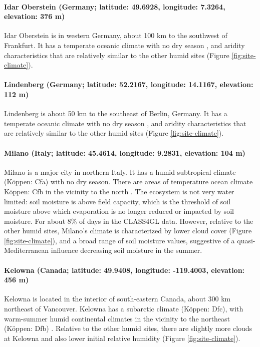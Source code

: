 \documentclass[12pt]{article}
\begin{document}
\paragraph{Idar Oberstein (Germany; latitude: 49.6928, longitude:
  7.3264, elevation: 376 m)} Idar Oberstein is in western Germany,
about 100 km to the southwest of Frankfurt. It has a temperate oceanic
climate with no dry season \cite[K\"{o}ppen: Cfb,][]{rubel2010}, and
aridity characteristics that are relatively similar to the other humid
sites (Figure \ref{fig:site-climate}).

\paragraph{Lindenberg (Germany; latitude: 52.2167, longitude:
  14.1167, elevation: 112 m)}

Lindenberg is about 50 km to the southeast of Berlin, Germany. It has
a temperate oceanic climate with no dry season \cite[(K\"{o}ppen:
  Cfb)][]{rubel2010}, and aridity characteristics that are relatively
similar to the other humid sites (Figure \ref{fig:site-climate}).

\paragraph{Milano (Italy; latitude: 45.4614, longitude: 9.2831, elevation: 104 m)}

Milano is a major city in northern Italy. It has a humid subtropical
climate (K\"{o}ppen: Cfa) with no dry season. There are areas of
temperature ocean climate K\"{o}ppen: Cfb in the vicinity to the north
\cite{rubel2010}. The ecosystem is not very water limited: soil
moisture is above field capacity, which is the threshold of soil
moisture above which evaporation is no longer reduced or impacted by
soil moisture. For about 8\% of days in the CLASS4GL data. However,
relative to the other humid sites, Milano's climate is characterized
by lower cloud cover (Figure \ref{fig:site-climate}), and a broad
range of soil moisture values, suggestive of a quasi-Mediterranean
influence decreasing soil moisture in the summer.

\paragraph{Kelowna (Canada; latitude: 49.9408, longitude: -119.4003,
  elevation: 456 m)}

Kelowna is located in the interior of south-eastern Canada, about
300 km northeast of Vancouver. Kelowna has a subarctic climate
(K\"{o}ppen: Dfc), with warm-summer humid continental climates in the
vicinity to the northeast (K\"{o}ppen: Dfb)
\cite[][]{rubel2010}. Relative to the other humid sites, there are
slightly more clouds at Kelowna and also lower initial relative
humidity (Figure \ref{fig:site-climate}).
\end{document}
